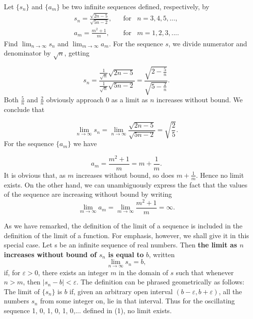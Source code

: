 \begin{example}
Let $\{s_n \}$ and $\{a_m\}$ be two infinite sequences defined, respectively, by
$$
\begin{array}{ll}
s_n  = \frac{\sqrt{2n - 5}}{\sqrt{5n - 2}}, \;\;\; &\mbox{for}\;\;\; n=3, 4, 5, ... ,\\
a_m = \frac{m^2 + 1}{m},                      \;\;\; &\mbox{for}\;\;\; m = 1, 2, 3, ... . \end{array}
$$
\noindent Find $\lim_{n \rightarrow \infty} s_n$ and $\lim_{m \rightarrow \infty} a_m$. For the sequence $s$, we divide numerator and denominator by $\sqrt{n}$, getting

$$
s_{n} = \frac{\frac{1}{\sqrt n} \sqrt{2n-5}}{\frac{1}{\sqrt n} \sqrt{5n-2}} 
= \frac{\sqrt{2 - \frac{5}{n}}}{\sqrt{5 - \frac{2}{n}}}.
$$
\noindent Both $\frac{5}{n}$ and $\frac{2}{n}$ obviously approach 0 as a limit as $n$ increases without bound. We conclude that 

$$
\lim_{n \rightarrow \infty} s_n = \lim_{n \rightarrow \infty} \frac{\sqrt{2n - 5}}{\sqrt{5n - 2}} = \sqrt{\frac{2}{5}}.
$$
\noindent For the sequence $\{ a_m \}$ we have

$$
a_m = \frac{m^2 + 1}{m} = m + \frac{1}{m}.
$$
\noindent It is obvious that, as $m$ increases without bound, so does $m + \frac{1}{m}$. Hence no limit exists. On the other hand, we can unambiguously express the fact that
the values of the sequence are increasing without bound by writing
$$
\lim_{m \rightarrow \infty} a_m= \lim_{m \rightarrow \infty} \frac{m^2 + 1}{ m} = \infty.
$$
\end{example}
\medskip

As we have remarked, the definition of the limit of a sequence is included in the definition of the limit of a function. For emphasis, however, we shall give it in this special case. Let s be an infinite sequence of real numbers. Then \textbf{the limit as $n$ increases without bound of $s_n$ is equal to} $b$, written
$$
\lim_{n \rightarrow \infty}s_n = b,
$$
\noindent if, for $\varepsilon > 0$, there exists an integer $m$ in the domain of $s$ such that whenever $n > m$, then $|s_{n} - b| < \varepsilon$. The definition can be phrased geometrically as follows: The limit of $\{ s_n \}$ is $b$ if, given an arbitrary open interval $(b - \varepsilon, b + \varepsilon)$, all the numbers $s_{n}$ from some integer on, lie in that interval. Thus for the oscillating sequence 1, 0, 1, 0, 1, 0,... defined in (1), no limit exists.

